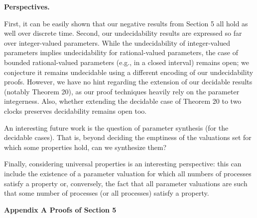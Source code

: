 \documentclass[10pt,a4paper]{article}
\begin{document}
 
 
\par\medskip\noindent\textbf{Perspectives.}\par
 
 
First, it can be easily shown that our negative results from Section 5 all hold as well over discrete time. Second, our undecidability results are expressed so far over integer-valued parameters. While the undecidability of integer-valued parameters implies undecidability for rational-valued parameters, the case of bounded rational-valued parameters (e.g., in a closed interval) remains open; we conjecture it remains undecidable using a different encoding of our undecidability proofs. However, we have no hint regarding the extension of our decidable results (notably Theorem 20), as our proof techniques heavily rely on the parameter integerness. Also, whether extending the decidable case of Theorem 20 to two clocks preserves decidability remains open too.\par
 
 
 
An interesting future work is the question of parameter synthesis (for the decidable cases). That is, beyond deciding the emptiness of the valuations set for which some properties hold, can we synthesize them?\par
 
 
 
Finally, considering universal properties is an interesting perspective: this can include the existence of a parameter valuation for which all numbers of processes satisfy a property or, conversely, the fact that all parameter valuations are such that some number of processes (or all processes) satisfy a property.\par
 
 
 


 
\par\medskip\noindent\textbf{Appendix A Proofs of Section 5}\par
 
\end{document}
